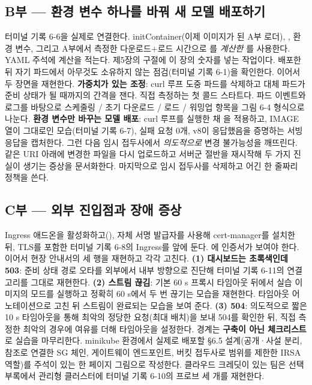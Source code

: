 \subsection*{B부 — 환경 변수 하나를 바꿔 새 모델 배포하기}

터미널 기록 6-6을 실제로 연결한다. initContainer(이제 이미지가 된 A부 로더), ,  환경 변수, 그리고 A부에서 측정한 다운로드+로드 시간으로 를 \textit{계산한} 를 사용한다. YAML 주석에 계산을 적는다. 제5장의 구절에 이 장의 숫자를 넣는 작업이다. 배포한 뒤 자기 파드에서 아무것도 소유하지 않는 점검(터미널 기록 6-1)을 확인한다. 이어서 두 장면을 재현한다. \textbf{가중치가 있는 조정}: curl 루프 도중 파드를 삭제하고 대체 파드가 준비 상태가 될 때까지의 간격을 잰다. 직접 측정하는 첫 콜드 스타트다. 파드 이벤트와 로그를 바탕으로 스케줄링 / 초기 다운로드 / 로드 / 워밍업 항목을 그림 6-4 형식으로 나눈다. \textbf{환경 변수만 바꾸는 모델 배포}: curl 루프를 실행한 채 을 적용하고, IMAGE 열이 그대로인 모습(터미널 기록 6-7), 실패 요청 0개, v8이 응답했음을 증명하는 서빙 응답을 캡처한다. 그런 다음 임시 접두사에서 \textit{의도적으로} 변경 불가능성을 깨뜨린다. 같은 URI 아래에 변경한 파일을 다시 업로드하고 서버군 절반을 재시작해 두 가지 진실이 생기는 증상을 문서화한다. 마지막으로 임시 접두사를 삭제하고 어긴 한 줄짜리 정책을 쓴다.

\subsection*{C부 — 외부 진입점과 장애 증상}

Ingress 애드온을 활성화하고(), 자체 서명 발급자를 사용해 cert-manager를 설치한 뒤, TLS를 포함한 터미널 기록 6-8의 Ingress를  앞에 둔다. 에 인증서가 보여야 한다. 이어서 현장 안내서의 세 행을 재현하고 각각 고친다. \textbf{(1) 대시보드는 초록색인데 503}: 준비 상태 경로 오타를 외부에서 내부 방향으로 진단해 터미널 기록 6-11의 연결 고리를 그대로 재현한다. \textbf{(2) 스트림 끊김}: 기본 60 s 프록시 타임아웃 뒤에서 실습 이미지의  모드를 실행하고 정확히 60 s에서 두 번 끊기는 모습을 재현한다. 타임아웃 어노테이션으로 고친 뒤 스트림이 완료되는 모습을 보여 준다. \textbf{(3) 504}: 의도적으로 짧은 10 s 타임아웃을 통해 최악의 정당한 요청(최대 배치)을 보내 504를 확인한 뒤, 직접 측정한 최악의 경우에 여유를 더해 타임아웃을 설정한다. 경계는 \textbf{구축이 아닌 체크리스트}로 실습을 마무리한다. minikube 환경에서 실제로 배포할 §6.5 설계(공개·사설 분리, 참조로 연결한 SG 체인, 게이트웨이 엔드포인트, 버킷 접두사로 범위를 제한한 IRSA 역할)를 주석이 있는 한 페이지 그림으로 작성한다. 클라우드 크레딧이 있는 팀은 선택 부록에서 관리형 클러스터에 터미널 기록 6-10의 프로브 세 개를 재현한다.

